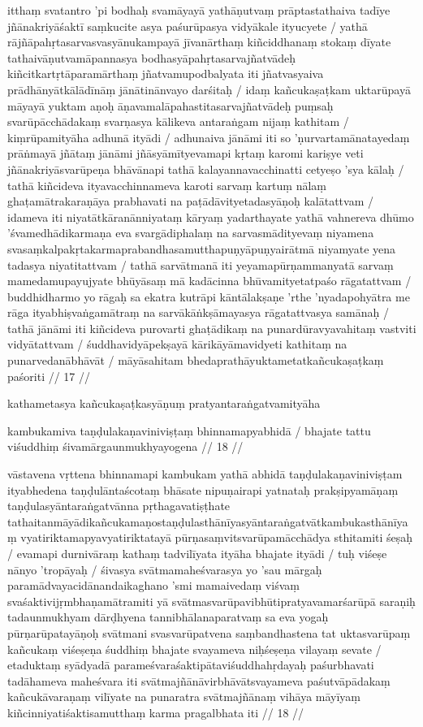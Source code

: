 itthaṃ svatantro 'pi bodhaḥ svamāyayā yathāṇutvaṃ prāptastathaiva tadīye jñānakriyāśaktī saṃkucite asya paśurūpasya vidyākale ityucyete  / yathā rājñāpahṛtasarvasvasyānukampayā jīvanārthaṃ kiñciddhanaṃ stokaṃ dīyate tathaivāṇutvamāpannasya bodhasyāpahṛtasarvajñatvādeḥ kiñcitkartṛtāparamārthaṃ jñatvamupodbalyata iti jñatvasyaiva prādhānyātkālādīnāṃ jānātinānvayo darśitaḥ  / idaṃ kañcukaṣaṭkam uktarūpayā māyayā yuktam aṇoḥ āṇavamalāpahastitasarvajñatvādeḥ puṃsaḥ svarūpācchādakaṃ svarṇasya kālikeva antaraṅgam nijaṃ kathitam  / kiṃrūpamityāha adhunā ityādi  / adhunaiva jānāmi iti so 'ṇurvartamānatayedaṃ prāṅmayā jñātaṃ jānāmi jñāsyāmītyevamapi kṛtaṃ karomi kariṣye veti jñānakriyāsvarūpeṇa bhāvānapi tathā kalayannavacchinatti cetyeṣo 'sya kālaḥ  / tathā kiñcideva ityavacchinnameva karoti sarvaṃ kartuṃ nālaṃ ghaṭamātrakaraṇāya prabhavati na paṭādāvityetadasyāṇoḥ kalātattvam  / idameva iti niyatātkāranānniyataṃ kāryaṃ yadarthayate yathā vahnereva dhūmo 'śvamedhādikarmaṇa eva svargādiphalaṃ na sarvasmādityevaṃ niyamena svasaṃkalpakṛtakarmaprabandhasamutthapuṇyāpuṇyairātmā niyamyate yena tadasya niyatitattvam  / tathā sarvātmanā iti yeyamapūrṇammanyatā sarvaṃ mamedamupayujyate bhūyāsaṃ mā kadācinna bhūvamityetatpaśo rāgatattvam  / buddhidharmo yo rāgaḥ sa ekatra kutrāpi kāntālakṣaṇe 'rthe 'nyadapohyātra me rāga ityabhiṣvaṅgamātraṃ na sarvākāṅkṣāmayasya rāgatattvasya samānaḥ  / tathā jānāmi iti kiñcideva purovarti ghaṭādikaṃ na punardūravyavahitaṃ vastviti vidyātattvam  / śuddhavidyāpekṣayā kārikāyāmavidyeti kathitaṃ na punarvedanābhāvāt  / māyāsahitam bhedaprathāyuktametatkañcukaṣaṭkaṃ paśoriti  // 17  //

kathametasya kañcukaṣaṭkasyāṇuṃ pratyantaraṅgatvamityāha

kambukamiva taṇḍulakaṇaviniviṣṭaṃ bhinnamapyabhidā  /
bhajate tattu viśuddhiṃ śivamārgaunmukhyayogena  // 18  //

vāstavena vṛttena bhinnamapi kambukam yathā abhidā taṇḍulakaṇaviniviṣṭam ityabhedena taṇḍulāntaścotaṃ bhāsate nipuṇairapi yatnataḥ prakṣipyamāṇaṃ taṇḍulasyāntaraṅgatvānna pṛthagavatiṣṭhate tathaitanmāyādikañcukamaṇostaṇḍulasthānīyasyāntaraṅgatvātkambukasthānīyaṃ vyatiriktamapyavyatiriktatayā pūrṇasaṃvitsvarūpamācchādya sthitamiti śeṣaḥ  / evamapi durnivāraṃ kathaṃ tadvilīyata ityāha bhajate ityādi  / tuḥ viśeṣe nānyo 'tropāyaḥ  / śivasya svātmamaheśvarasya yo 'sau mārgaḥ paramādvayacidānandaikaghano 'smi mamaivedaṃ viśvaṃ svaśaktivijṛmbhaṇamātramiti yā svātmasvarūpavibhūtipratyavamarśarūpā saraṇiḥ tadaunmukhyam dārḍhyena tannibhālanaparatvaṃ sa eva yogaḥ pūrṇarūpatayāṇoḥ svātmani svasvarūpatvena saṃbandhastena tat uktasvarūpaṃ kañcukaṃ viśeṣeṇa śuddhiṃ bhajate svayameva niḥśeṣeṇa vilayaṃ sevate  / etaduktaṃ syādyadā parameśvaraśaktipātaviśuddhahṛdayaḥ paśurbhavati tadāhameva maheśvara iti svātmajñānāvirbhāvātsvayameva paśutvāpādakaṃ kañcukāvaraṇaṃ vilīyate na punaratra svātmajñānaṃ vihāya māyīyaṃ kiñcinniyatiśaktisamutthaṃ karma pragalbhata iti  // 18  //

